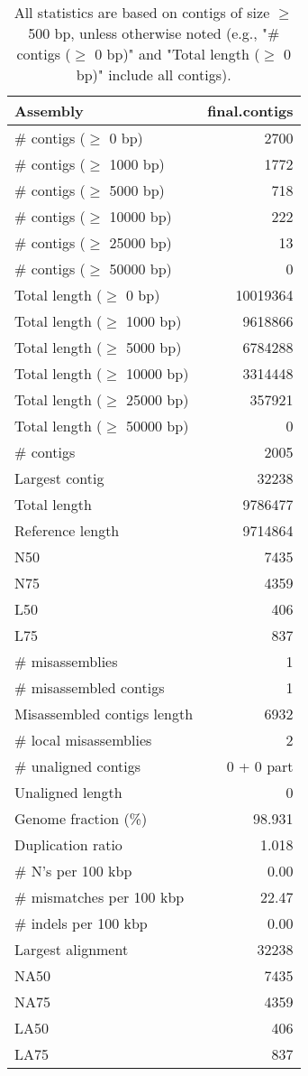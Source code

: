 \documentclass[12pt,a4paper]{article}
\begin{document}
\begin{table}[ht]
\begin{center}
\caption{All statistics are based on contigs of size $\geq$ 500 bp, unless otherwise noted (e.g., "\# contigs ($\geq$ 0 bp)" and "Total length ($\geq$ 0 bp)" include all contigs).}
\begin{tabular}{|l*{1}{|r}|}
\hline
Assembly & final.contigs \\ \hline
\# contigs ($\geq$ 0 bp) & 2700 \\ \hline
\# contigs ($\geq$ 1000 bp) & 1772 \\ \hline
\# contigs ($\geq$ 5000 bp) & 718 \\ \hline
\# contigs ($\geq$ 10000 bp) & 222 \\ \hline
\# contigs ($\geq$ 25000 bp) & 13 \\ \hline
\# contigs ($\geq$ 50000 bp) & 0 \\ \hline
Total length ($\geq$ 0 bp) & 10019364 \\ \hline
Total length ($\geq$ 1000 bp) & 9618866 \\ \hline
Total length ($\geq$ 5000 bp) & 6784288 \\ \hline
Total length ($\geq$ 10000 bp) & 3314448 \\ \hline
Total length ($\geq$ 25000 bp) & 357921 \\ \hline
Total length ($\geq$ 50000 bp) & 0 \\ \hline
\# contigs & 2005 \\ \hline
Largest contig & 32238 \\ \hline
Total length & 9786477 \\ \hline
Reference length & 9714864 \\ \hline
N50 & 7435 \\ \hline
N75 & 4359 \\ \hline
L50 & 406 \\ \hline
L75 & 837 \\ \hline
\# misassemblies & 1 \\ \hline
\# misassembled contigs & 1 \\ \hline
Misassembled contigs length & 6932 \\ \hline
\# local misassemblies & 2 \\ \hline
\# unaligned contigs & 0 + 0 part \\ \hline
Unaligned length & 0 \\ \hline
Genome fraction (\%) & 98.931 \\ \hline
Duplication ratio & 1.018 \\ \hline
\# N's per 100 kbp & 0.00 \\ \hline
\# mismatches per 100 kbp & 22.47 \\ \hline
\# indels per 100 kbp & 0.00 \\ \hline
Largest alignment & 32238 \\ \hline
NA50 & 7435 \\ \hline
NA75 & 4359 \\ \hline
LA50 & 406 \\ \hline
LA75 & 837 \\ \hline
\end{tabular}
\end{center}
\end{table}
\end{document}
